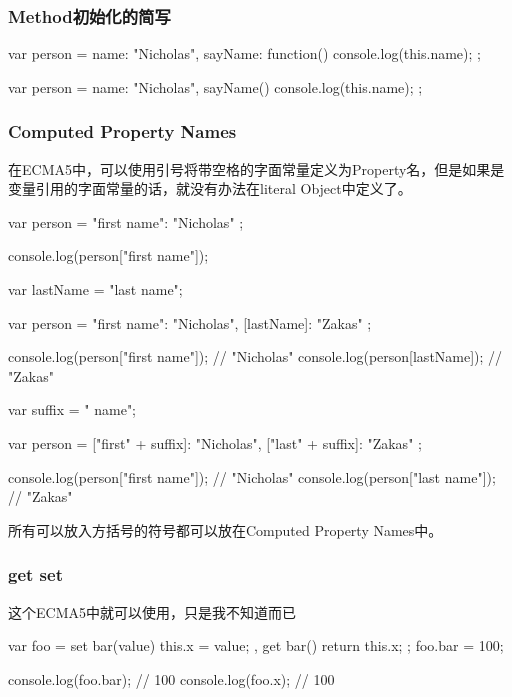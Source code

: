 \subsubsection{Method初始化的简写}
\begin{JavaScript}[ecma5]
var person = {
    name: "Nicholas",
    sayName: function() {
        console.log(this.name);
    }
};
\end{JavaScript} 

\begin{JavaScript}[ecma6]
var person = {
    name: "Nicholas",
    sayName() {
        console.log(this.name);
    }
};
\end{JavaScript}

\subsubsection{Computed Property Names}
在ECMA5中，可以使用引号将带空格的字面常量定义为Property名，但是如果是变量引用的字面常量的话，就没有办法在literal Object中定义了。
\begin{JavaScript}
var person = {
    "first name": "Nicholas"
};

console.log(person["first name"]);   
\end{JavaScript}

\begin{JavaScript}
var lastName = "last name";

var person = {
    "first name": "Nicholas",
    [lastName]: "Zakas"
};

console.log(person["first name"]);      // "Nicholas"
console.log(person[lastName]);          // "Zakas"
\end{JavaScript}
 
\begin{JavaScript}[ecma6]
var suffix = " name";

var person = {
    ["first" + suffix]: "Nicholas",
    ["last" + suffix]: "Zakas"
};

console.log(person["first name"]);      // "Nicholas"
console.log(person["last name"]);       // "Zakas"
\end{JavaScript}
 
所有可以放入方括号的符号都可以放在Computed Property Names中。

\subsubsection{get set}
这个ECMA5中就可以使用，只是我不知道而已
\begin{JavaScript}
var foo = {
	set bar(value){
		this.x = value;
	},
	get bar() {
		return this.x;
	}
};
foo.bar = 100;

console.log(foo.bar); // 100
console.log(foo.x);   // 100

\end{JavaScript}
 

